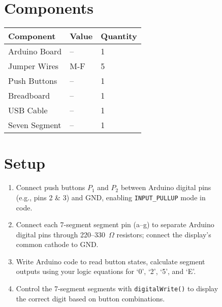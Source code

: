 \documentclass[12pt,a4paper]{article}
\begin{document}
\begin{figure}[H]
\begin{minipage}[t]{0.48\textwidth}
    \section*{Components}
    \small
    \renewcommand{\arraystretch}{1.3}
    \begin{tabular}{|l|l|l|}
      \hline
      \textbf{Component} & \textbf{Value} & \textbf{Quantity} \\ \hline
      Arduino Board & -- & 1 \\ \hline
      Jumper Wires & M-F & 5 \\ \hline
      Push Buttons & -- & 1 \\ \hline
      Breadboard & -- & 1 \\ \hline
      USB Cable & -- & 1 \\ \hline
      Seven Segment & -- & 1 \\ \hline
    \end{tabular}

    \vspace{0.8cm}

    \section*{Setup}
    \small
    \begin{enumerate}
      \item Connect push buttons $P_1$ and $P_2$ between Arduino digital pins (e.g., pins 2 \& 3) and GND, enabling \texttt{INPUT\_PULLUP} mode in code.
      \item Connect each 7-segment segment pin (a--g) to separate Arduino digital pins through 220--330~$\Omega$ resistors; connect the display’s common cathode to GND.
      \item Write Arduino code to read button states, calculate segment outputs using your logic equations for ‘0’, ‘2’, ‘5’, and ‘E’.
      \item Control the 7-segment segments with \texttt{digitalWrite()} to display the correct digit based on button combinations.
    \end{enumerate}
  \end{minipage}
\end{figure}

\newpage
\end{document}
